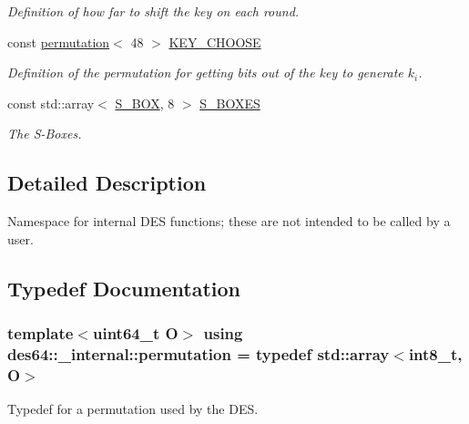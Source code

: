 \begin{DoxyCompactItemize}
\begin{DoxyCompactList}\small\item\em Definition of how far to shift the key on each round. \end{DoxyCompactList}\item 
const \hyperlink{namespacedes64_1_1__internal_a5b829bc1e22d70ed35b925f8971a88d3}{permutation}$<$ 48 $>$ \hyperlink{namespacedes64_1_1__internal_aae8bb2ebf658b6bfb76e64bbb3d9bf3b}{K\+E\+Y\+\_\+\+C\+H\+O\+O\+SE}
\begin{DoxyCompactList}\small\item\em Definition of the permutation for getting bits out of the key to generate $ k_i $. \end{DoxyCompactList}\item 
const std\+::array$<$ \hyperlink{namespacedes64_1_1__internal_a7c6e061269c399077858cb1504a53463}{S\+\_\+\+B\+OX}, 8 $>$ \hyperlink{namespacedes64_1_1__internal_ab6b95bc050b8e9ce0fe63190e204b022}{S\+\_\+\+B\+O\+X\+ES}
\begin{DoxyCompactList}\small\item\em The S-\/\+Boxes. \end{DoxyCompactList}\end{DoxyCompactItemize}


\subsection{Detailed Description}
Namespace for internal D\+ES functions; these are not intended to be called by a user. 

\subsection{Typedef Documentation}
\subsubsection[{\texorpdfstring{permutation}{permutation}}]{\setlength{\rightskip}{0pt plus 5cm}template$<$uint64\+\_\+t O$>$ using {\bf des64\+::\+\_\+internal\+::permutation} = typedef std\+::array$<$int8\+\_\+t, O$>$}\hypertarget{namespacedes64_1_1__internal_a5b829bc1e22d70ed35b925f8971a88d3}{}\label{namespacedes64_1_1__internal_a5b829bc1e22d70ed35b925f8971a88d3}


Typedef for a permutation used by the D\+ES. 

